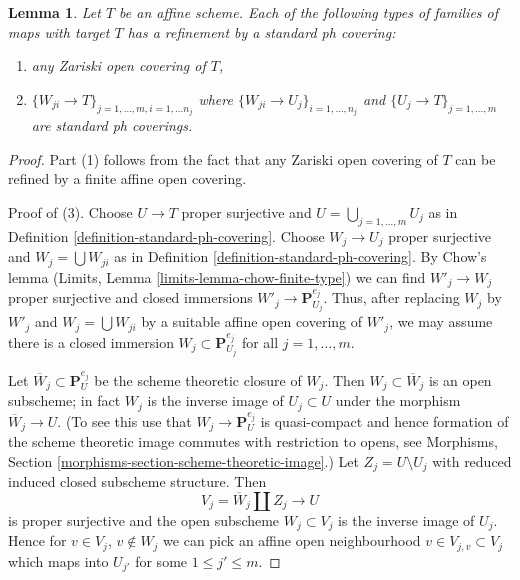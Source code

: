 \documentclass{stacks-project}
\theoremstyle{plain}
\newtheorem{lemma}[subsection]{Lemma}
\theoremstyle{definition}
\theoremstyle{remark}
\numberwithin{equation}{subsection}
\begin{document}
\begin{lemma}
\label{lemma-refine-by-standard-ph}
Let $T$ be an affine scheme. Each of the following types of families
of maps with target $T$ has a refinement by a standard ph covering:
\begin{enumerate}
\item any Zariski open covering of $T$,
\item $\{W_{ji} \to T\}_{j = 1, \ldots, m, i = 1, \ldots n_j}$
where $\{W_{ji} \to U_j\}_{i = 1, \ldots, n_j}$
and $\{U_j \to T\}_{j = 1, \ldots, m}$ are standard ph coverings.
\end{enumerate}
\end{lemma}

\begin{proof}
Part (1) follows from the fact that any Zariski open covering of $T$
can be refined by a finite affine open covering.

\medskip\noindent
Proof of (3). Choose $U \to T$ proper surjective and
$U = \bigcup_{j = 1, \ldots, m} U_j$ as in
Definition \ref{definition-standard-ph-covering}.
Choose $W_j \to U_j$ proper surjective and $W_j = \bigcup W_{ji}$
as in Definition \ref{definition-standard-ph-covering}.
By Chow's lemma (Limits, Lemma \ref{limits-lemma-chow-finite-type})
we can find $W'_j \to W_j$ proper surjective
and closed immersions $W'_j \to \mathbf{P}^{e_j}_{U_j}$.
Thus, after replacing $W_j$ by $W'_j$ and $W_j = \bigcup W_{ji}$
by a suitable affine open covering of $W'_j$, we may assume
there is a closed immersion $W_j \subset \mathbf{P}^{e_j}_{U_j}$
for all $j = 1, \ldots, m$.

\medskip\noindent
Let $\overline{W}_j \subset \mathbf{P}^{e_j}_U$ be the
scheme theoretic closure of $W_j$. Then $W_j \subset \overline{W}_j$
is an open subscheme; in fact $W_j$ is the inverse image of
$U_j \subset U$ under the morphism $\overline{W}_j \to U$.
(To see this use that $W_j \to \mathbf{P}^{e_j}_U$ is quasi-compact
and hence formation of the scheme theoretic image commutes
with restriction to opens, see
Morphisms, Section \ref{morphisms-section-scheme-theoretic-image}.)
Let $Z_j = U \setminus U_j$
with reduced induced closed subscheme structure.
Then
$$
V_j = \overline{W}_j \amalg Z_j \to U
$$
is proper surjective and the open subscheme $W_j \subset V_j$
is the inverse image of $U_j$. Hence for $v \in V_j$, $v \not \in W_j$
we can pick an affine open neighbourhood $v \in V_{j, v} \subset V_j$
which maps into $U_{j'}$ for some $1 \leq j' \leq m$.


\end{proof}
\end{document}
